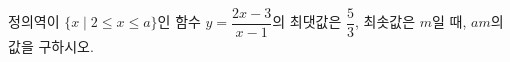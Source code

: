 \hspace*{2mm}\begin{minipage}[t]{\dimexpr\linewidth-2mm\relax}\vspace{0pt}
정의역이 $\{x \mid 2\le x\le a\}$인 함수 $y=\dfrac{2x-3}{x-1}$의 최댓값은 $\dfrac{5}{3}$, 최솟값은 $m$일 때, $am$의 값을 구하시오. \end{minipage}
